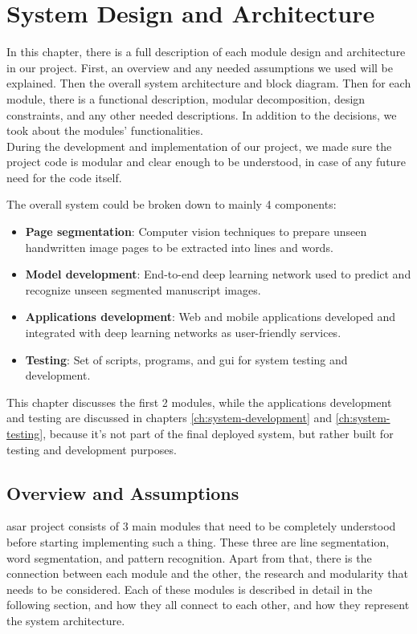 \chapter{System Design and Architecture}
\label{ch:system-design}
\quad In this chapter, there is a full description of each module design and architecture in our project. First, an overview and any needed assumptions we used will be explained. Then the overall system architecture and block diagram. Then for each module, there is a functional description, modular decomposition, design constraints, and any other needed descriptions. In addition to the decisions, we took about the modules' functionalities. \\

During the development and implementation of our project, we made sure the project code is modular and clear enough to be understood, in case of any future need for the code itself.

\bigskip
\noindent 
The overall system could be broken down to mainly 4 components:
\begin{itemize}[itemsep=1pt, topsep=5pt]
    \item \textbf{Page segmentation}: Computer vision techniques to prepare unseen handwritten image pages to be extracted into lines and words.
    \item \textbf{Model development}: End-to-end deep learning network used to predict and recognize unseen segmented manuscript images.
    \item \textbf{Applications development}: Web and mobile applications developed and integrated with deep learning networks as user-friendly services. 
    \item \textbf{Testing}: Set of scripts, programs, and \acrfull{gui} for system testing and development. 
\end{itemize}

This chapter discusses the first 2 modules, while the applications development and testing are discussed in chapters \ref{ch:system-development} and \ref{ch:system-testing}, because it's not part of the final deployed system, but rather built for testing and development purposes.

\section{Overview and Assumptions}
\acrshort{asar} project consists of 3 main modules that need to be completely understood before starting implementing such a thing. These three are line segmentation, word segmentation, and pattern recognition. Apart from that, there is the connection between each module and the other, the research and modularity that needs to be considered. Each of these modules is described in detail in the following section, and how they all connect to each other, and how they represent the system architecture. \\

